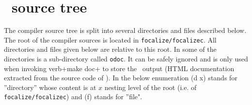 
\section{\focalizec\ source tree}
The compiler source tree is split into several directories and files
described below. The root of the compiler sources is located in
{\tt focalize/focalizec}. All directories and files given below are
relative to this root. In some of the directories is a sub-directory
called {\tt odoc}. It can be safely ignored and is only used when
invoking verb+make doc+ to store the \ocamldoc\ output (HTML
documentation extracted from the source code of \focalize). In the
below enumeration (d x) stands for ''directory'' whose content is at
$x$ nesting level of the root (i.e. of {\tt focalize/focalizec}) and
(f) stands for ''file".

